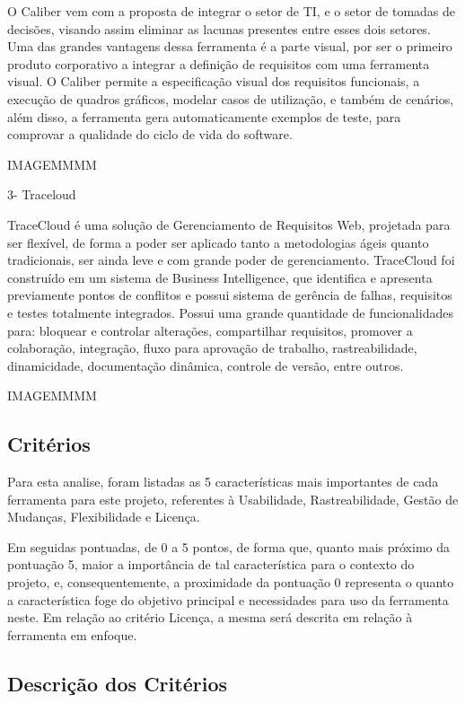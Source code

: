 O Caliber vem com a proposta de integrar o setor de TI, e o setor de tomadas de decisões, visando assim eliminar as lacunas presentes entre esses dois setores. Uma das grandes vantagens dessa ferramenta é a parte visual, por ser o primeiro produto corporativo a integrar a definição de requisitos com uma ferramenta visual. O Caliber permite a especificação visual dos requisitos funcionais, a execução de quadros gráficos, modelar casos de utilização, e também de cenários, além disso, a ferramenta gera automaticamente exemplos de teste, para comprovar a qualidade do ciclo de vida do software.

IMAGEMMMM


3- Traceloud

TraceCloud é uma solução de Gerenciamento de Requisitos Web, projetada para ser flexível, de forma a poder ser aplicado tanto a metodologias ágeis quanto tradicionais, ser ainda leve e com grande poder de gerenciamento. TraceCloud foi construído em um sistema de Business Intelligence, que identifica e apresenta previamente pontos de conflitos e possui sistema de gerência de falhas, requisitos e testes totalmente integrados. Possui uma grande quantidade de funcionalidades para: bloquear e controlar alterações, compartilhar requisitos, promover a colaboração, integração, fluxo para aprovação de trabalho, rastreabilidade, dinamicidade, documentação dinâmica, controle de versão,  entre outros.

IMAGEMMMM

\subsection {Critérios}

Para esta analise, foram listadas as 5 características mais importantes de cada ferramenta para este projeto, referentes à Usabilidade, Rastreabilidade, Gestão de Mudanças, Flexibilidade e Licença.

Em seguidas pontuadas, de 0 a 5 pontos, de forma que, quanto mais próximo da pontuação 5, maior a importância de tal característica para o contexto do projeto, e, consequentemente, a proximidade da pontuação 0 representa o quanto a característica foge do objetivo principal e necessidades para uso da ferramenta neste. Em relação ao critério Licença, a mesma será descrita em relação à ferramenta em enfoque.

\subsection {Descrição dos Critérios}

